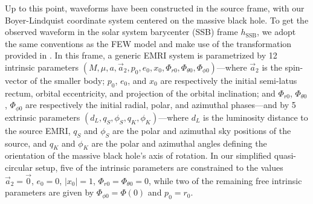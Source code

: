 \documentclass[%
 reprint,
 nofootinbib,
 amsmath,amssymb,
 aps,
 prd,
]{revtex4-2}
\begin{document}
Up to this point, waveforms have been constructed in the source frame, with our Boyer-Lindquist coordinate system centered on the massive black hole. To get the observed waveform in the solar system barycenter (SSB) frame $h_\mathrm{SSB}$, we adopt the same conventions as the \textsc{FEW} model and make use of the transformation provided in \cite{KatzETC21}. In this frame, 
a generic EMRI system is parametrized by 12 intrinsic parameters $(M, \mu, a, \vec{a}_2, p_0, e_0, x_0, \Phi_{r0}, \Phi_{\theta 0}, \Phi_{\phi 0})$---where $\vec{a}_2$ is the spin-vector of the smaller body; $p_0$, $e_0$, and $x_0$ are respectively the initial semi-latus rectum, orbital eccentricity, and projection of the orbital inclination; and $\Phi_{r0}$, $\Phi_{\theta 0}$, $\Phi_{\phi 0}$ are respectively the initial radial, polar, and azimuthal phases---and by 5 extrinsic parameters $(d_L, q_S, \phi_S, q_K, \phi_K)$---where $d_L$ is the luminosity distance to the source EMRI, $q_S$ and $\phi_S$ are the polar and azimuthal sky positions of the source, and $q_K$ and $\phi_K$ are the polar and azimuthal angles defining the orientation of the massive black hole's axis of rotation. In our simplified quasi-circular setup, five of the intrinsic parameters are constrained to the values $\vec{a}_2 = \vec{0}$, $e_0 = 0$, $|x_0| = 1$, $\Phi_{r0} = \Phi_{\theta 0} = 0$, while two of the remaining free intrinsic parameters are given by $\Phi_{\phi 0} = \Phi(0)$ and $p_0 = r_0$.
\end{document}
